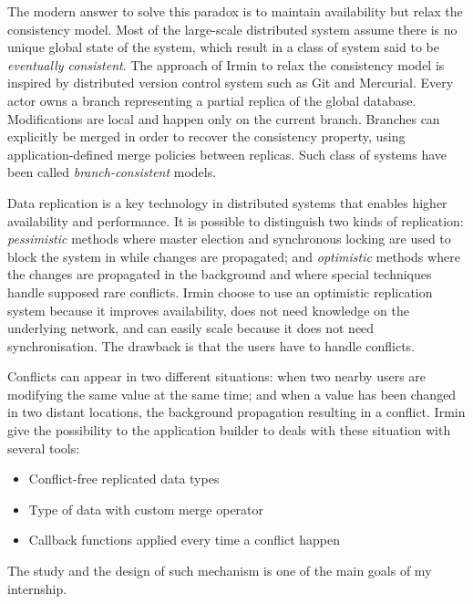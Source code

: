 \documentclass{article}
\renewcommand{\-}{\hyp}
\newcommand{\irmin}{Irmin\xspace}
\newcommand{\git}{Git\xspace}
\newcommand{\mercurial}{Mercurial\xspace}
\begin{document}
The modern answer to solve this paradox is to maintain availability but relax the consistency model.
Most of the large-scale distributed system assume there is no unique global state of the system, which result in a class of system said to be \emph{eventually consistent}\cite{EventuallyConsistentTransactions2012}.
The approach of \irmin to relax the consistency model is inspired by distributed version control system such as \git and \mercurial.
Every actor owns a branch representing a partial replica of the global database.
Modifications are local and happen only on the current branch.
Branches can explicitly be merged in order to recover the consistency property, using application-defined merge policies between replicas.
Such class of systems have been called \emph{branch-consistent} models.

Data replication is a key technology in distributed systems that enables higher availability and performance.
It is possible to distinguish two kinds of replication:
\emph{pessimistic}\cite{ImplementingFaulttolerantServices1990}\cite{ParttimeParliament1998}\cite{UnderstandableConsensusAlgorithm2014} methods where master election and synchronous locking are used to block the system in while changes are propagated;
and \emph{optimistic}\cite{OptimisticReplication2005} methods where the changes are propagated in the background and where special techniques handle supposed rare conflicts.
\irmin choose to use an optimistic replication system because it improves availability, does not need knowledge on the underlying network, and can easily scale because it does not need synchronisation.
The drawback is that the users have to handle conflicts.

Conflicts can appear in two different situations:
when two nearby users are modifying the same value at the same time;
and when a value has been changed in two distant locations, the background propagation resulting in a conflict.
\irmin give the possibility to the application builder to deals with these situation with several tools:
\begin{itemize}
	\item Conflict-free replicated data types\cite{ConflictfreeReplicatedDataTypes2011}
	\item Type of data with custom merge operator
	\item Callback functions applied every time a conflict happen
\end{itemize}
The study and the design of such mechanism is one of the main goals of my internship.
\end{document}
